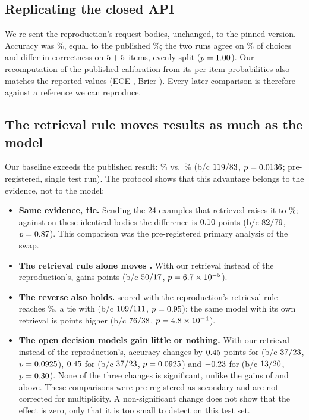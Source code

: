 \subsection{Replicating the closed API}
\label{sec:res-replication}
We re-sent the reproduction's \fsN{} request bodies, unchanged, to the pinned \jev{} version. Accuracy was
\fsJevAAcc\%, equal to the published \fsJevPubAcc\%; the two runs agree on \fsJevAAgreement\% of choices and differ
in correctness on $5+5$ items, evenly split ($p=1.00$). Our recomputation of the
published calibration from its per-item probabilities also matches the reported values (ECE \fsJevPubEce, Brier
\fsJevPubBrier). Every later \jev{} comparison is therefore against a reference we can reproduce.

\subsection{The retrieval rule moves results as much as the model}
\label{sec:res-retrieval}
Our baseline \orb{} exceeds the published \jev{} result:
\fsCleanAcc\% vs.\ \fsJevPubAcc\% (b/c $119/83$, $p=0.0136$; pre-registered,
single test run). The protocol shows that this advantage belongs to the evidence, not to the model:

\begin{itemize}
  \item \textbf{Same evidence, tie.} Sending \jev{} the 24 examples that \orb{} retrieved raises it to
  \fsJevBAcc\%; against \orb{} on these identical bodies the difference is $0.10$ points
  (b/c $82/79$, $p=0.87$). This comparison was the pre-registered primary
  analysis of the swap.
  \item \textbf{The retrieval rule alone moves \jev.} With our retrieval instead of the reproduction's, \jev{} gains
  \fsJevBMinusJevAPt{} points (b/c $50/17$, $p=6.7\times10^{-5}$).
  \item \textbf{The reverse also holds.} \orb{} scored with the reproduction's retrieval rule reaches
  \fsParBestAcc\%, a tie with \jev{} (b/c $109/111$, $p=0.95$); the same model
  with its own retrieval is \fsCleanMinusParBestPt{} points higher (b/c $76/38$,
  $p=4.8\times10^{-4}$).
  \item \textbf{The open decision models gain little or nothing.} With our retrieval instead of the
  reproduction's, accuracy changes by $0.45$ points for \pplx{} (b/c
  $37/23$, $p=0.0925$), $0.45$ for \clef{} (b/c
  $37/23$, $p=0.0925$) and $-0.23$ for \flash{} (b/c
  $13/20$, $p=0.30$). None of the three changes is significant, unlike
  the gains of \jev{} and \orb{} above. These comparisons were pre-registered as secondary and are not corrected
  for multiplicity. A non-significant change does not show that the effect is zero, only that it is too small to
  detect on this test set.
\end{itemize}

